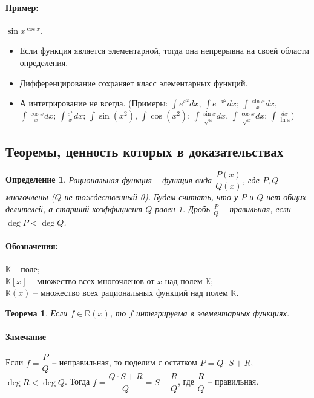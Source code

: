 \documentclass{article}
\theoremstyle{plain}
\newtheorem{theorem}{Теорема}
\newtheorem{definition}{Определение}
\theoremstyle{definition}
\theoremstyle{remark}
\begin{document}
\paragraph{Пример:} $\sin x ^{\cos x}$.\\

\begin{itemize}
    \item Если функция является элементарной, тогда она непрерывна на своей области определения.
    \item Дифференцирование сохраняет класс элементарных функций.
    \item А интегрирование не всегда. (Примеры: $\int e^{x^2}dx$, $\int e^{-x^2}dx$; $\int \frac{\sin x}{x}dx$, $\int \frac{\cos x}{x}dx$; $\int \frac{e^x}{x}dx$; $\int \sin(x^2)$,  $\int \cos(x^2)$; $\int \frac{\sin x}{\sqrt{x}}dx$, $\int \frac{\cos x}{\sqrt{x}}dx$; $\int \frac{dx}{\ln x}$)
\end{itemize}

\subsection{Теоремы, ценность которых в доказательствах}
\begin{definition}
Рациональная функция -- функция вида $\dfrac{P(x)}{Q(x)}$, где $P, Q$ -- многочлены ($Q$ не тождественный 0).
Будем считать, что у $P$ и $Q$ нет общих делителей, а старший коэффициент $Q$ равен 1.
Дробь $\frac{P}{Q}$ -- правильная, если $\deg P < \deg Q$.
\end{definition}
\paragraph{Обозначения:} $\mathbb{K}$ -- поле;\\
$\mathbb{K}[x]$ -- множество всех многочленов от $x$ над полем $\mathbb{K}$;\\ 
$\mathbb{K}(x)$ -- множество всех рациональных функций  над полем $\mathbb{K}$.

\begin{theorem}\label{th:int_rat}
Если $f \in\mathbb{R}(x)$, то $f$ интегрируема в элементарных функциях.
\end{theorem}
\paragraph{Замечание} Если $f = \dfrac{P}{Q}$ -- неправильная, то поделим с остатком $P = Q\cdot S + R$, $\deg R < \deg Q$. Тогда $f = \dfrac{Q\cdot S + R}{Q} = S + \dfrac{R}{Q}$, где $\dfrac{R}{Q}$ -- правильная.\\
\end{document}
